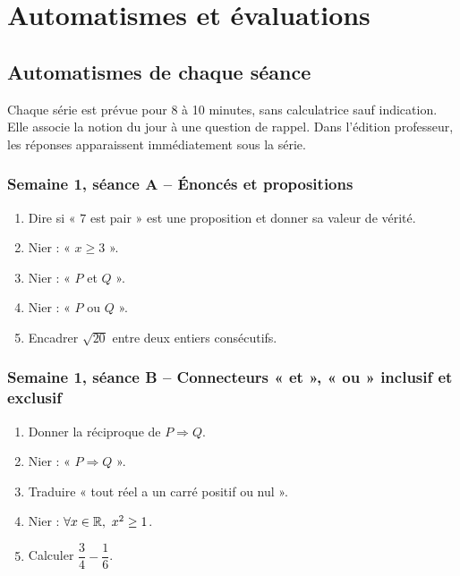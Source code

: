 \part{Automatismes et évaluations}
\chapter{Automatismes de chaque séance}

Chaque série est prévue pour 8 à 10 minutes, sans calculatrice sauf indication.
Elle associe la notion du jour à une question de rappel. Dans l'édition
professeur, les réponses apparaissent immédiatement sous la série.

\section{Semaine 1, séance A -- Énoncés et propositions}
\begin{enumerate}
  \item Dire si « $7$ est pair » est une proposition et donner sa valeur de vérité.
  \item Nier : « $x\geq 3$ ».
  \item Nier : « $P$ et $Q$ ».
  \item Nier : « $P$ ou $Q$ ».
  \item Encadrer $\sqrt{20}$ entre deux entiers consécutifs.
\end{enumerate}

\section{Semaine 1, séance B -- Connecteurs « et », « ou » inclusif et exclusif}
\begin{enumerate}
  \item Donner la réciproque de $P\Rightarrow Q$.
  \item Nier : « $P\Rightarrow Q$ ».
  \item Traduire « tout réel a un carré positif ou nul ».
  \item Nier : $\forall x\in\R,\ x^2\geq1$.
  \item Calculer $\dfrac34-\dfrac16$.
\end{enumerate}

